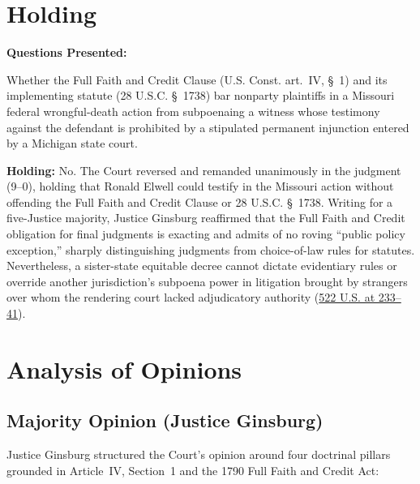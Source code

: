 \documentclass[12pt]{article}
\begin{document}
\section{Holding}
\textbf{Questions Presented:}

Whether the Full Faith and Credit Clause (U.S. Const. art.~IV, \S~1) and its implementing statute (28 U.S.C. \S~1738) bar nonparty plaintiffs in a Missouri federal wrongful-death action from subpoenaing a witness whose testimony against the defendant is prohibited by a stipulated permanent injunction entered by a Michigan state court.

\textbf{Holding:} No. The Court reversed and remanded unanimously in the judgment (9--0), holding that Ronald Elwell could testify in the Missouri action without offending the Full Faith and Credit Clause or 28 U.S.C. \S~1738. Writing for a five-Justice majority, Justice Ginsburg reaffirmed that the Full Faith and Credit obligation for final judgments is exacting and admits of no roving ``public policy exception,'' sharply distinguishing judgments from choice-of-law rules for statutes. Nevertheless, a sister-state equitable decree cannot dictate evidentiary rules or override another jurisdiction's subpoena power in litigation brought by strangers over whom the rendering court lacked adjudicatory authority (\href{https://www.law.cornell.edu/supremecourt/text/96-653}{522 U.S. at 233--41}).

\section{Analysis of Opinions}
\subsection{Majority Opinion (Justice Ginsburg)}

Justice Ginsburg structured the Court's opinion around four doctrinal pillars grounded in Article~IV, Section~1 and the 1790 Full Faith and Credit Act:
\end{document}
